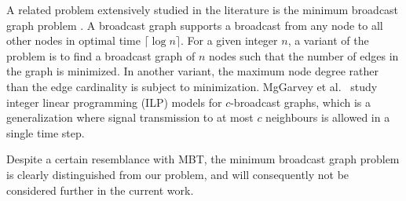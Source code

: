 A related problem extensively studied in the literature is the minimum broadcast graph problem \cite{grigni91,mcgarvey16}. 
A broadcast graph supports a broadcast from any node to all other nodes in optimal time $\lceil\log n\rceil$.
For a given integer $n$, a variant of the problem is to find a broadcast graph of $n$ nodes such that the number of edges in the graph is minimized.
In another variant, the maximum node degree rather than the edge cardinality is subject to minimization.
MgGarvey et al.\ \cite{mcgarvey16} study integer linear programming (ILP) models for $c$-broadcast graphs, which is a generalization where signal transmission to at most $c$ neighbours is allowed in a single time step.

Despite a certain resemblance with MBT, the minimum broadcast graph problem is clearly distinguished from our problem,
and will consequently not be considered further in the current work.

